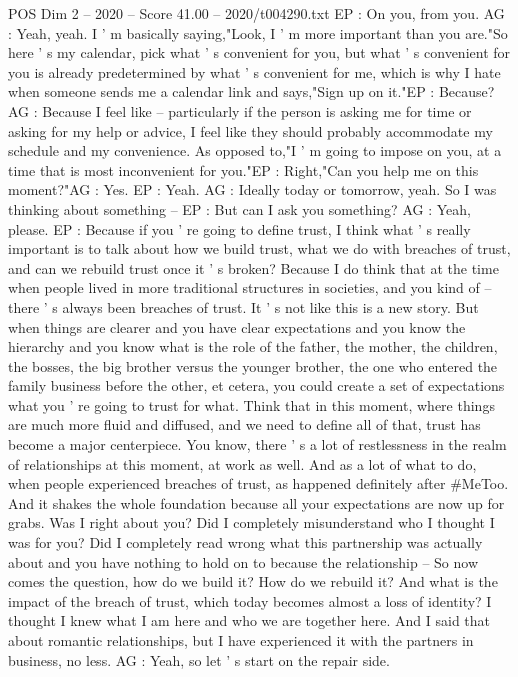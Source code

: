 \begin{textsample}{POS Dim 2 – 2020 – Score 41.00 – 2020/t004290.txt}
EP : On you, from you.
AG : Yeah, yeah.
I ' m basically saying,"Look, I ' m more important than you are."So here ' s my calendar, pick what ' s convenient for you, but what ' s convenient for you is already predetermined by what ' s convenient for me, which is why I hate when someone sends me a calendar link and says,"Sign up on it."EP : Because?
AG : Because I feel like -- particularly if the person is asking me for time or asking for my help or advice, I feel like they should probably accommodate my schedule and my convenience.
As opposed to,"I ' m going to impose on you, at a time that is most inconvenient for you."EP : Right,"Can you help me on this moment?"AG : Yes.
EP : Yeah.
AG : Ideally today or tomorrow, yeah.
So I was thinking about something -- EP : But can I ask you something?
AG : Yeah, please.
EP : Because if you ' re going to define trust, I think what ' s really important is to talk about how we build trust, what we do with breaches of trust, and can we rebuild trust once it ' s broken?
Because I do think that at the time when people lived in more traditional structures in societies, and you kind of -- there ' s always been breaches of trust.
It ' s not like this is a new story.
But when things are clearer and you have clear expectations and you know the hierarchy and you know what is the role of the father, the mother, the children, the bosses, the big brother versus the younger brother, the one who entered the family business before the other, et cetera, you could create a set of expectations what you ' re going to trust for what.
Think that in this moment, where things are much more fluid and diffused, and we need to define all of that, trust has become a major centerpiece.
You know, there ' s a lot of restlessness in the realm of relationships at this moment, at work as well.
And as a lot of what to do, when people experienced breaches of trust, as happened definitely after \#MeToo.
And it shakes the whole foundation because all your expectations are now up for grabs.
Was I right about you?
Did I completely misunderstand who I thought I was for you?
Did I completely read wrong what this partnership was actually about and you have nothing to hold on to because the relationship -- So now comes the question, how do we build it?
How do we rebuild it?
And what is the impact of the breach of trust, which today becomes almost a loss of identity?
I thought I knew what I am here and who we are together here.
And I said that about romantic relationships, but I have experienced it with the partners in business, no less.
AG : Yeah, so let ' s start on the repair side.

\end{textsample}

